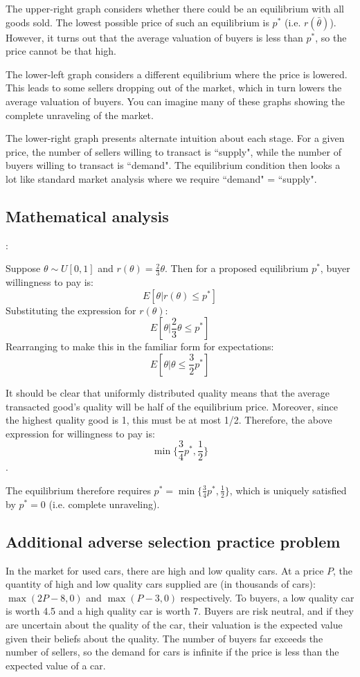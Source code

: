 \documentclass[letter,12pt]{article}
\begin{document}
The upper-right graph considers whether there could be an equilibrium with all goods sold. The lowest possible price of such an equilibrium is $p^*$ (i.e. $r(\bar{\theta})$). However, it turns out that the average valuation of buyers is less than $p^*$, so the price cannot be that high. 

The lower-left graph considers a different equilibrium where the price is lowered. This leads to some sellers dropping out of the market, which in turn lowers the average valuation of buyers. You can imagine many of these graphs showing the complete unraveling of the market.

The lower-right graph presents alternate intuition about each stage. For a given price, the number of sellers willing to transact is ``supply", while the number of buyers willing to transact is ``demand". The equilibrium condition then looks a lot like standard market analysis where we require ``demand" = ``supply".

\subsection{Mathematical analysis}:

Suppose $\theta \sim U[0,1]$ and $r(\theta)=\frac{2}{3}\theta$. Then for a proposed equilibrium $p^*$, buyer willingness to pay is: $$E[\theta|r(\theta)\leq p^*]$$ Substituting the expression for $r(\theta)$: $$E[\theta|\frac{2}{3}\theta\leq p^*]$$ Rearranging to make this in the familiar form for expectations: $$E[\theta|\theta\leq \frac{3}{2}p^*]$$ 

It should be clear that uniformly distributed quality means that the average transacted good's quality will be half of the equilibrium price. Moreover, since the highest quality good is 1, this must be at most 1/2. Therefore, the above expression for willingness to pay is: $$\min\{\frac{3}{4}p^*,\frac{1}{2} \}$$.

The equilibrium therefore requires $p^*=\min\{\frac{3}{4}p^*,\frac{1}{2} \}$, which is uniquely satisfied by $p^*=0$ (i.e. complete unraveling).

\subsection{Additional adverse selection practice problem}

In the market for used cars, there are high and low quality cars. At a price $P$, the quantity of high and low quality cars supplied are (in thousands of cars): $\max(2P -8, 0)$ and $\max(P - 3, 0)$ respectively. To buyers, a low quality car is worth 4.5 and a high quality car is worth 7. Buyers are risk neutral, and if they are uncertain about the quality of the car, their valuation is the expected value given their beliefs about the quality. The number of buyers far exceeds the number of sellers, so the demand for cars is infinite if the price is less than the expected value of a car.
\end{document}
